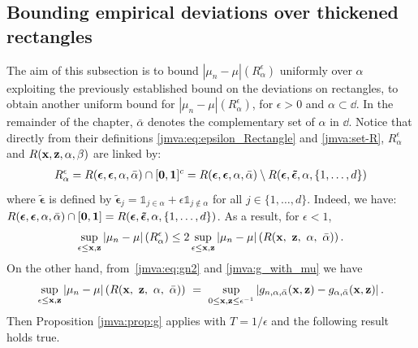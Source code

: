 \subsection{Bounding empirical deviations over thickened rectangles}%
\label{jmva:sec:boundErrorEpsilonCones}
The aim of this subsection is to bound $|\mu_n - \mu|(R_\alpha^\epsilon)$ uniformly over $\alpha$ exploiting the previously established
bound on the deviations on rectangles, to obtain another uniform  bound for %
$|\mu_n-\mu|(R_\alpha^\epsilon)$, for $\epsilon >0$ and $\alpha \subset \dd$. In the remainder of the chapter, $\bar \alpha$ denotes the complementary set of $\alpha$ in $\dd$.
Notice that directly from their definitions \eqref{jmva:eq:epsilon_Rectangle} and \eqref{jmva:set-R}, $R_\alpha^\epsilon$ and $R(\mathbf x, \mathbf z, \alpha, \beta)$ are linked by: 
\begin{align*}
R_\alpha^\epsilon = R(\boldsymbol \epsilon, \boldsymbol  \epsilon, \alpha, \bar \alpha) \cap [\mathbf 0, \mathbf 1]^c = R(\boldsymbol \epsilon, \boldsymbol  \epsilon, \alpha, \bar \alpha) \setminus R(\boldsymbol \epsilon, \boldsymbol{\tilde \epsilon}, \alpha, \{1,\ldots, d\})
\end{align*}
where $\boldsymbol{\tilde \epsilon}$ is defined by $\boldsymbol{\tilde \epsilon}_j = \mathds{1}_{j \in \alpha} + \epsilon \mathds{1}_{j \notin \alpha}$ for all $j \in \{1,\ldots,d\}$.
Indeed, we have: $R(\boldsymbol \epsilon, \boldsymbol  \epsilon, \alpha, \bar \alpha) \cap [\mathbf 0, \mathbf 1] = R(\boldsymbol \epsilon, \boldsymbol{\tilde \epsilon}, \alpha, \{1,\ldots, d\})$.
As a result, for $\epsilon < 1$,
$$\sup_{\epsilon \le \mathbf x, \mathbf z }|\mu_n-\mu|\left(R_\alpha^\epsilon\right) \le 2 \sup_{\epsilon \le \mathbf x, \mathbf z }|\mu_n-\mu|\left(R(\mathbf x,~ \mathbf z,~ \alpha,~ \bar \alpha)\right).$$
On the other hand, from~\eqref{jmva:eq:gn2} and \eqref{jmva:g_with_mu} we have 
\begin{align*}
\sup_{\epsilon \le \mathbf x, \mathbf z }|\mu_n-\mu|\left(R(\mathbf x,~ \mathbf z,~ \alpha,~ \bar \alpha)\right) ~=~ \sup_{0 \le \mathbf x, \mathbf z \le \epsilon^{-1}} \left| g_{n, \alpha, \bar \alpha}(\mathbf x, \mathbf z) - g_{\alpha, \bar \alpha}(\mathbf x, \mathbf z) \right|.
\end{align*}
\noindent
Then Proposition \ref{jmva:prop:g} applies with $T = 1/\epsilon$ and the following result holds true.
